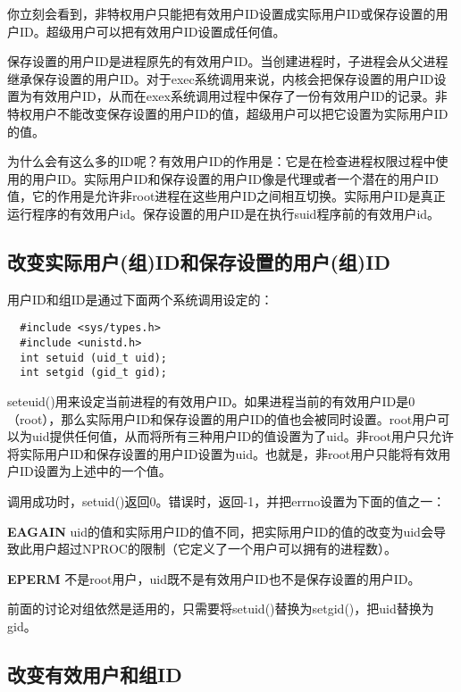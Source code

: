 你立刻会看到，非特权用户只能把有效用户ID设置成实际用户ID或保存设置的用户ID。超级用户可以把有效用户ID设置成任何值。

保存设置的用户ID是进程原先的有效用户ID。当创建进程时，子进程会从父进程继承保存设置的用户ID。对于exec系统调用来说，内核会把保存设置的用户ID设置为有效用户ID，从而在exex系统调用过程中保存了一份有效用户ID的记录。非特权用户不能改变保存设置的用户ID的值，超级用户可以把它设置为实际用户ID的值。

为什么会有这么多的ID呢？有效用户ID的作用是：它是在检查进程权限过程中使用的用户ID。实际用户ID和保存设置的用户ID像是代理或者一个潜在的用户ID值，它的作用是允许非root进程在这些用户ID之间相互切换。实际用户ID是真正运行程序的有效用户id。保存设置的用户ID是在执行suid程序前的有效用户id。

\subsection{改变实际用户(组)ID和保存设置的用户(组)ID}

用户ID和组ID是通过下面两个系统调用设定的：

\begin{lstlisting}
  #include <sys/types.h>
  #include <unistd.h>
  int setuid (uid_t uid);
  int setgid (gid_t gid);
\end{lstlisting}

seteuid()用来设定当前进程的有效用户ID。如果进程当前的有效用户ID是0（root），那么实际用户ID和保存设置的用户ID的值也会被同时设置。root用户可以为uid提供任何值，从而将所有三种用户ID的值设置为了uid。非root用户只允许将实际用户ID和保存设置的用户ID设置为uid。也就是，非root用户只能将有效用户ID设置为上述中的一个值。

调用成功时，setuid()返回0。错误时，返回-1，并把errno设置为下面的值之一：

\begin{eqlist*}
\item[\textbf{EAGAIN}] uid的值和实际用户ID的值不同，把实际用户ID的值的改变为uid会导致此用户超过NPROC的限制（它定义了一个用户可以拥有的进程数）。
\item[\textbf{EPERM}] 不是root用户，uid既不是有效用户ID也不是保存设置的用户ID。
\end{eqlist*}

前面的讨论对组依然是适用的，只需要将setuid()替换为setgid()，把uid替换为gid。

\subsection{改变有效用户和组ID}


